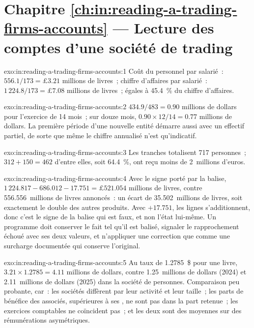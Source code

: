 \section*{Chapitre \ref{ch:in:reading-a-trading-firms-accounts} --- Lecture des comptes d'une société de trading}

\begin{solution}{exo:in:reading-a-trading-firms-accounts:1}
Coût du personnel par salarié~: $556.1/173=\pounds3.21$ millions de livres~; chiffre d'affaires par salarié~: $1\,224.8/173=\pounds7.08$ millions de livres~; 
égales à 45.4~\% du chiffre d'affaires.
\end{solution}

\begin{solution}{exo:in:reading-a-trading-firms-accounts:2}
$434.9/483=0.90$ millions de dollars pour l'exercice de 14 mois~; sur douze mois, $0.90\times12/14=0.77$ millions de dollars. La première période
d'une nouvelle entité démarre aussi avec un effectif partiel, de sorte que même le chiffre annualisé n'est qu'indicatif.
\end{solution}

\begin{solution}{exo:in:reading-a-trading-firms-accounts:3}
Les tranches totalisent 717 personnes~; $312+150=462$ d'entre elles, soit 64.4~\%, ont reçu moins de 2~millions d'euros.
\end{solution}

\begin{solution}{exo:in:reading-a-trading-firms-accounts:4}
Avec le signe porté par la balise, $1\,224.817-686.012-17.751=\pounds521.054$ millions de livres, contre 556.556~millions de livres annoncés~: un écart
de 35.502~millions de livres, soit exactement le double des autres produits. Avec $+17.751$, les lignes s'additionnent, donc c'est le signe de la balise qui est faux,
et non l'état lui-même. Un programme doit conserver le fait tel qu'il est balisé, signaler le rapprochement échoué avec ses deux valeurs, et
n'appliquer une correction que comme une surcharge documentée qui conserve l'original.
\end{solution}

\begin{solution}{exo:in:reading-a-trading-firms-accounts:5}
Au taux de 1.2785~\$ pour une livre, $3.21\times1.2785=4.11$ millions de dollars, contre 1.25~millions de dollars (2024) et 2.11~millions de dollars (2025) dans
la société de personnes. Comparaison peu probante, car~: les sociétés diffèrent par leur activité et leur taille~; les parts de bénéfice des associés, supérieures
à ses , ne sont pas dans la part retenue~; les exercices comptables ne coïncident pas~; et les deux sont des moyennes sur des rémunérations asymétriques.
\end{solution}

